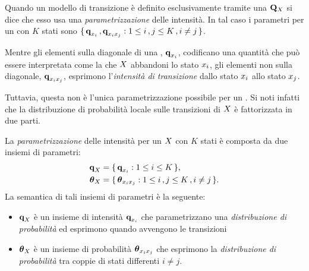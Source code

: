 Quando un modello di transizione è definito esclusivamente tramite una \im*{} $\mathbf{Q}_{\mathnormal{X}}$ si dice che esso usa una \emph{parametrizzazione } delle intensità. In tal caso i parametri per un \mprocess*{} \omog*{} con $K$ stati sono $\{\,\boldsymbol{\textbf{\text{q}}}_{\mathnormal{x}_i}\,,\boldsymbol{\textbf{\text{q}}}_{\mathnormal{x}_i\mathnormal{x}_j} : 1 \leq i\,,j \leq K\,,i \neq j\,\}$.

Mentre gli elementi sulla diagonale di una \im*{}, $\boldsymbol{\textbf{\text{q}}}_{\mathnormal{x}_i}$, codificano una quantità che può essere interpretata come la \emph{} che $\mathnormal{X}$ abbandoni lo stato $\mathnormal{x}_i$, gli elementi non sulla diagonale, $\boldsymbol{\textbf{\text{q}}}_{\mathnormal{x}_i\mathnormal{x}_j}$, esprimono l'\emph{intensità di transizione} dallo stato $\mathnormal{x}_i$ allo stato $\mathnormal{x}_j$.

Tuttavia, questa non è l'unica parametrizzazione possibile per un \mprocess*{} \omog*{}. Si noti infatti che la distribuzione di probabilità locale sulle transizioni di $\mathnormal{X}$ è fattorizzata in due parti.
\begin{definizione}\label{defn:mixed-parametrization}
La \emph{parametrizzazione } delle intensità per un \mprocess*{} \omog*{} $\mathnormal{X}$ con $K$ stati è composta da due insiemi di parametri:
\begin{equation}
\begin{split}
\boldsymbol{\textbf{\text{q}}}_{\mathnormal{X}} &= \{\, \boldsymbol{\textbf{\text{q}}}_{\mathnormal{x}_i} : 1 \leq i \leq K \,\} \text{,} \nonumber\\
\boldsymbol{\textbf{\text{$\theta$}}}_{\mathnormal{X}} &= \{\, \boldsymbol{\textbf{\text{$\theta$}}}_{\mathnormal{x}_i\mathnormal{x}_j} : 1 \leq i\,,j \leq K\,,i \neq j \,\} \text{.}
\end{split}
\end{equation}
La semantica di tali insiemi di parametri è la seguente:
\begin{itemize}
    \item $\boldsymbol{\textbf{\text{q}}}_{\mathnormal{X}}$ è un insieme di intensità $\boldsymbol{\textbf{\text{q}}}_{\mathnormal{x}_i}$ che parametrizzano una \emph{distribuzione di probabilità } ed esprimono quando avvengono le transizioni
    \item $\boldsymbol{\textbf{\text{$\theta$}}}_{\mathnormal{X}}$ è un insieme di probabilità $\boldsymbol{\textbf{\text{$\theta$}}}_{\mathnormal{x}_i\mathnormal{x}_j}$ che esprimono la \emph{distribuzione di probabilità } tra coppie di stati differenti $i \neq j$.
\end{itemize}
\end{definizione}
